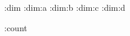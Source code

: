 \newcount\transfactor
{}


\newdimen\trans:dim
\newdimen\trans:dim:a
\newdimen\trans:dim:b
\newdimen\trans:dim:c
\newdimen\trans:dim:d

\newcount\trans:count

\def\trans:def{}
\def\trans:def:a{}
\def\trans:def:b{}
\def\trans:def:c{}
\def\trans:def:d{}


\def\transboxini{%
 \afterassignment\transboxcheck
 \setbox\transbox}

\def\transboxcheck{%
 \ifvoid\transbox
  \expandafter\aftergroup
 \fi\transboxtodo}


\def\transhboxini{%
 \afterassignment\transhboxcheck
 \setbox\transbox}

\def\transhboxcheck{%
 \ifvoid\transbox
  \expandafter\aftergroup\expandafter\transhboxwrap
 \else
  \expandafter\transhboxwrap
 \fi}

\def\transhboxwrap{%
 \ifvbox\transbox
  \setbox\transbox\hbox{\box\transbox}%
 \fi
 \transboxtodo}

\long\def\transboxdef#1\transboxend{%
 \bgroup\def\transboxtodo{#1\egroup}\transboxini}

\long\def\transhboxdef#1\transboxend{%
 \bgroup\def\transboxtodo{#1\egroup}\transhboxini}


